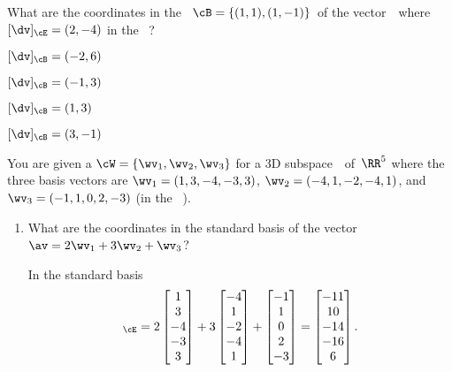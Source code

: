 \begin{activity}
What are the coordinates in the ~\(\cB=\{(1,1),(1,-1)\}\)\ of the vector~\dv\ where \([\dv]_\cE=(2,-4)\) in the ~\cE?
\begin{parts}
\item \([\dv]_\cB=(-2,6)\)
\item \([\dv]_\cB=(-1,3)\)\actans
\item \([\dv]_\cB=(1,3)\)
\item \([\dv]_\cB=(3,-1)\)
\end{parts}
\end{activity}





\begin{example} \label{eg:}
You are given a  \(\cW=\{\wv_1,\wv_2,\wv_3\}\) for a 3D subspace~\WW\ of~\(\RR^5\) where the three basis vectors are
\(\wv_1=(1,3,-4,-3,3)\),
\(\wv_2=(-4,1,-2,-4,1)\), and
\(\wv_3=(-1,1,0,2,-3)\) (in the ~\cE).
\begin{enumerate}
\item What are the coordinates in the standard basis of the vector \(\av=2\wv_1+3\wv_2+\wv_3\)?
\begin{solution} 
In the standard basis
\begin{equation*}
[\av]_\cE=2\begin{bmatrix} 1\\3\\-4\\-3\\3 \end{bmatrix}
+3\begin{bmatrix} -4\\1\\-2\\-4\\1 \end{bmatrix}
+\begin{bmatrix} -1\\1\\0\\2\\-3 \end{bmatrix}
=\begin{bmatrix} -11\\ 10\\-14\\-16\\  6 \end{bmatrix}.
\end{equation*}
\end{solution}


\end{enumerate}
\end{example}
